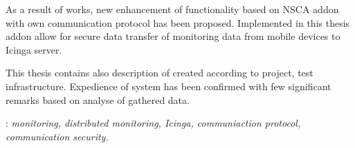 \begin{titlepage}
{      \indent As a result of works, new enhancement of functionality
      based on NSCA addon with own communication protocol has been
      proposed. Implemented in this thesis addon allow for secure data
      transfer of monitoring data from mobile devices to Icinga
      server.

      \indent This thesis contains also description of created
      according to project, test infrastructure. Expedience of system
      has been confirmed with few significant remarks based on analyse
      of gathered data.
    } \vspace*{1\baselineskip}

    : {\itshape monitoring, distributed
      monitoring, Icinga, communiaction protocol, communication security.}

\end{titlepage}

